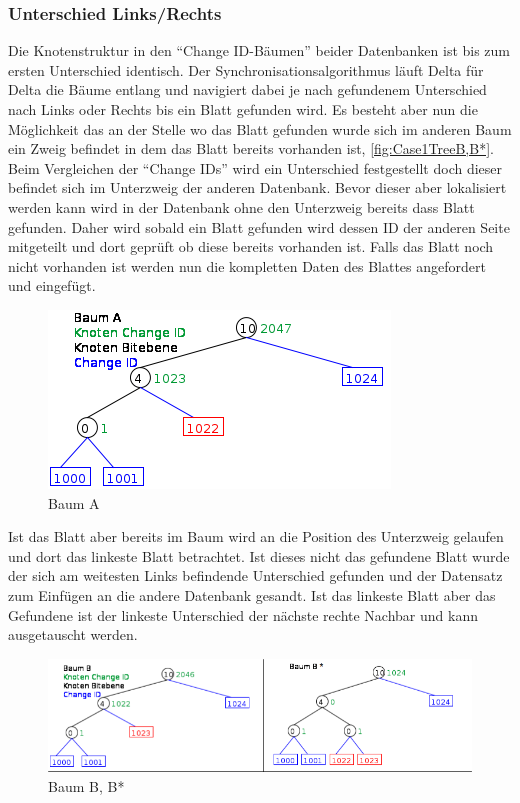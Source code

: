 \documentclass[a4paper,11pt,oneside,%
headsepline,												%
footsepline,												%
bibtotocnumbered									%
]{scrreprt}
\begin{document}
\subsubsection{Unterschied Links/Rechts}
\label{sec:SynchroDiffLeftOrRight}
Die Knotenstruktur in den \enquote{Change ID-Bäumen} beider Datenbanken ist bis zum ersten Unterschied identisch. Der Synchronisationsalgorithmus läuft Delta für Delta die Bäume entlang und navigiert dabei je nach gefundenem Unterschied nach Links oder Rechts bis ein Blatt gefunden wird. Es besteht aber nun die Möglichkeit das an der Stelle wo das Blatt gefunden wurde sich im anderen Baum ein Zweig befindet in dem das Blatt bereits vorhanden ist, \autoref{fig:Case1TreeB,B*}. Beim Vergleichen der \enquote{Change IDs} wird ein Unterschied festgestellt doch dieser befindet sich im Unterzweig der anderen Datenbank. Bevor dieser aber lokalisiert werden kann wird in der Datenbank ohne den Unterzweig bereits dass Blatt gefunden. Daher wird sobald ein Blatt gefunden wird dessen ID der anderen Seite mitgeteilt und dort geprüft ob diese bereits vorhanden ist. Falls das Blatt noch nicht vorhanden ist werden nun die kompletten Daten des Blattes angefordert und eingefügt.\begin{figure}
  \begin{center}
    \includegraphics[width=0.9\linewidth]{bilder/Case1TreeA.png}
  \end{center}
 \caption{Baum A}
 \label{fig:Case1TreeA}
\end{figure} Ist das Blatt aber bereits im Baum wird an die Position des Unterzweig gelaufen und dort das linkeste Blatt betrachtet. Ist dieses nicht das gefundene Blatt wurde der sich am weitesten Links befindende Unterschied gefunden und der Datensatz zum Einfügen an die andere Datenbank gesandt. Ist das linkeste Blatt aber das Gefundene ist der linkeste Unterschied der nächste rechte Nachbar und kann ausgetauscht werden.
\begin{figure}[h!]
  \begin{center}
    \includegraphics[width=0.9\linewidth]{bilder/Case B Baeume.png}
  \end{center}
 \caption{Baum B, B*}
  \label{fig:Case1TreeB,B*}
\end{figure}
\end{document}
